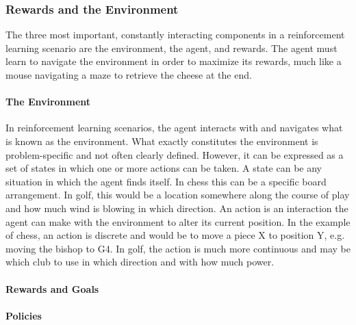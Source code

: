 \subsubsection{Rewards and the Environment}


The three most important, constantly interacting components in a reinforcement
learning scenario are
the environment, the agent, and rewards.
%
The agent must learn to navigate the environment in order to maximize its
rewards,
much like a mouse navigating a maze to retrieve the cheese at the end.

\paragraph{The Environment}

In reinforcement learning scenarios,
the agent interacts with and navigates what is known as the environment.
%
What exactly constitutes the environment is problem-specific and not often
clearly defined.
%
However, it can be expressed as a set of states in which one or more actions
can be taken.
%
A state can be any situation in which the agent finds itself.
%
In chess this can be a specific board arrangement.
%
In golf, this would be a location somewhere along the course of play and how
much wind is blowing in which direction.
%
An action is an interaction the agent can make with the environment to alter
its current position.
%
In the example of chess,
an action is discrete and would be to move a piece X to position Y,
e.g. moving the bishop to G4.
%
In golf, the action is much more continuous and may be
which club to use in which direction and with how much power.

\paragraph{Rewards and Goals}

\paragraph{Policies}
